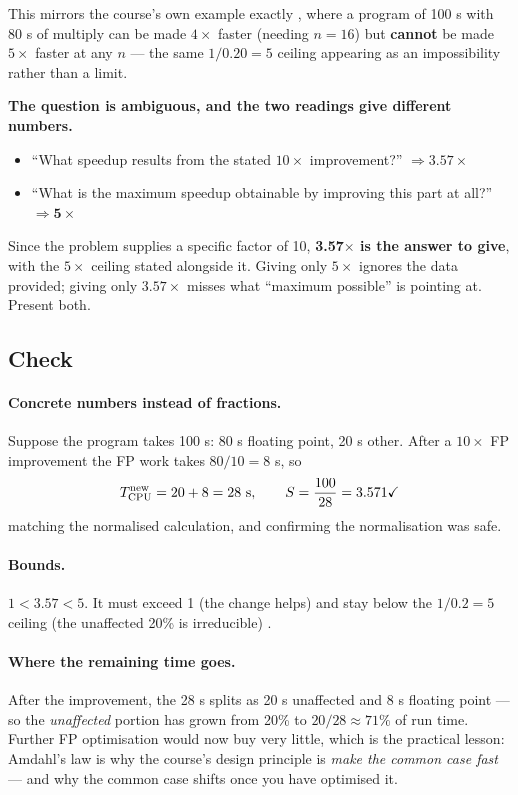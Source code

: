 This mirrors the course's own example exactly , where
a program of 100 s with 80 s of multiply can be made $4\times$ faster (needing
$n = 16$) but \textbf{cannot} be made $5\times$ faster at any $n$ — the same
$1/0.20 = 5$ ceiling appearing as an impossibility rather than a limit.

\begin{trap}
\textbf{The question is ambiguous, and the two readings give different numbers.}
\begin{itemize}[nosep]
  \item ``What speedup results from the stated $10\times$ improvement?''
    $\Rightarrow \mathbf{3.57\times}$
  \item ``What is the maximum speedup obtainable by improving this part at all?''
    $\Rightarrow \mathbf{5\times}$
\end{itemize}
Since the problem supplies a specific factor of 10, \textbf{3.57$\times$ is the
answer to give}, with the $5\times$ ceiling stated alongside it. Giving only
$5\times$ ignores the data provided; giving only $3.57\times$ misses what
``maximum possible'' is pointing at. Present both.
\end{trap}

\subsection*{Check}

\paragraph{Concrete numbers instead of fractions.}
Suppose the program takes 100 s: 80 s floating point, 20 s other. After a
$10\times$ FP improvement the FP work takes $80/10 = 8$ s, so
\begin{equation}
  \CPUtime^{\text{new}} = 20 + 8 = 28\ \text{s},
  \qquad \speedup = \frac{100}{28} = 3.571 \checkmark
\end{equation}
matching the normalised calculation, and confirming the normalisation was safe.

\paragraph{Bounds.}
$1 < 3.57 < 5$. It must exceed 1 (the change helps) and stay below the $1/0.2 = 5$
ceiling (the unaffected 20\% is irreducible) \checkmark.

\paragraph{Where the remaining time goes.}
After the improvement, the 28 s splits as 20 s unaffected and 8 s floating point
--- so the \emph{unaffected} portion has grown from 20\% to $20/28 \approx 71\%$
of run time. Further FP optimisation would now buy very little, which is the
practical lesson: Amdahl's law is why the course's design principle is
\emph{make the common case fast}  --- and why the
common case shifts once you have optimised it.


